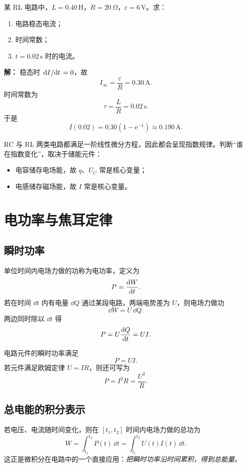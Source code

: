 \begin{example}
某 RL 电路中，$L=0.40\,\text{H}$，$R=20\,\Omega$，$\varepsilon=6\,\text{V}$。求：
\begin{enumerate}
  \item 电路稳态电流；
  \item 时间常数；
  \item $t=0.02\,\text{s}$ 时的电流。
\end{enumerate}

\textbf{解：}
稳态时 $\dv*{I}{t}=0$，故
\[
I_{\infty}=\frac{\varepsilon}{R}=0.30\,\text{A}.
\]
时间常数为
\[
\tau=\frac{L}{R}=0.02\,\text{s}.
\]
于是
\[
I(0.02)=0.30\left(1-\mathrm{e}^{-1}\right)\approx 0.190\,\text{A}.
\]
\end{example}

\begin{remark}
RC 与 RL 两类电路都满足一阶线性微分方程，因此都会呈现指数规律。判断“谁在指数变化”，取决于储能元件：
\begin{itemize}
  \item 电容储存电场能，故 $q$、$U_C$ 常是核心变量；
  \item 电感储存磁场能，故 $I$ 常是核心变量。
\end{itemize}
\end{remark}

\section{电功率与焦耳定律}

\subsection{瞬时功率}

单位时间内电场力做的功称为电功率，定义为
\[
P=\dv{W}{t}.
\]
若在时间 $\dd t$ 内有电量 $\dd Q$ 通过某段电路，两端电势差为 $U$，则电场力做功
\[
\dd W=U\,\dd Q.
\]
两边同时除以 $\dd t$ 得
\[
P=U\dv{Q}{t}=UI.
\]

\begin{law}[电功率公式]
电路元件的瞬时功率满足
\[
P=UI.
\]
若元件满足欧姆定律 $U=IR$，则还可写为
\[
P=I^2R=\frac{U^2}{R}.
\]
\end{law}

\subsection{总电能的积分表示}

若电压、电流随时间变化，则在 $[t_1,t_2]$ 时间内电场力做的总功为
\[
W=\int_{t_1}^{t_2} P(t)\,\dd t
=\int_{t_1}^{t_2} U(t)I(t)\,\dd t.
\]
这正是微积分在电路中的一个直接应用：\emph{把瞬时功率沿时间累积，得到总能量。}

